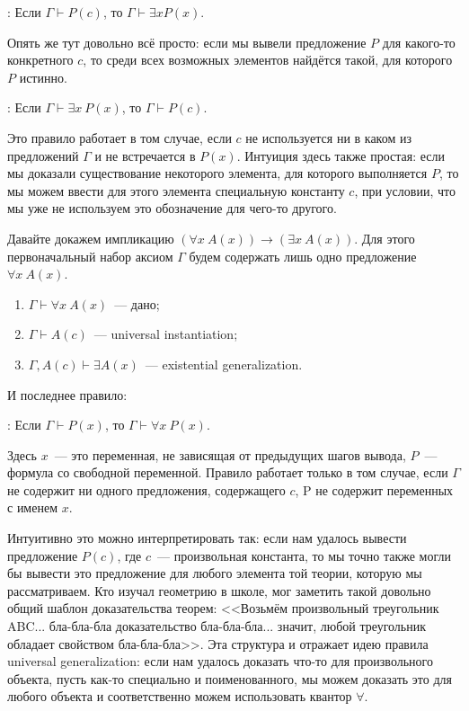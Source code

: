 : Если $\Gamma \vdash P(c)$, то $\Gamma\vdash \exists x P(x)$.

Опять же тут довольно всё просто: если мы вывели предложение $P$ для какого-то конкретного $c$, то среди всех возможных элементов найдётся такой, для которого $P$ истинно.

: Если $\Gamma \vdash \exists x\ P(x)$, то $\Gamma \vdash P(c)$.

Это правило работает в том случае, если $c$ не используется ни в каком из предложений $\Gamma$ и не встречается в $P(x)$. Интуиция здесь также простая: если мы доказали существование некоторого элемента, для которого выполняется $P$, то мы можем ввести для этого элемента специальную константу $c$, при условии, что мы уже не используем это обозначение для чего-то другого.


\begin{example}
Давайте докажем импликацию $(\forall x\ A(x)) \to (\exists x\ A(x))$. Для этого первоначальный набор аксиом $\Gamma$ будем содержать лишь одно предложение $\forall x\ A(x)$.
\begin{enumerate}
\item $\Gamma\vdash \forall x\ A(x)$~--- дано;
\item $\Gamma \vdash A(c)$~--- universal instantiation;
\item $\Gamma, A(c) \vdash \exists A(x)$~--- existential generalization.
\end{enumerate}
\end{example}

И последнее правило:

: Если $\Gamma \vdash P(x)$, то $\Gamma\vdash \forall x\ P(x)$.

Здесь $x$~--- это переменная, не зависящая от предыдущих шагов вывода, $P$~--- формула со свободной переменной. Правило работает только в том случае, если $\Gamma$ не содержит ни одного предложения, содержащего $c$, P не содержит переменных с именем $x$.

Интуитивно это можно интерпретировать так: если нам удалось вывести предложение $P(c)$, где $c$~--- произвольная константа, то мы точно также могли бы вывести это предложение для любого элемента той теории, которую мы рассматриваем. Кто изучал геометрию в школе, мог заметить такой довольно общий шаблон доказательства теорем: <<Возьмём произвольный треугольник ABC... бла-бла-бла доказательство бла-бла-бла... значит, любой треугольник обладает свойством бла-бла-бла>>. Эта структура и отражает идею правила universal generalization: если нам удалось доказать что-то для произвольного объекта, пусть как-то специально и поименованного, мы можем доказать это для любого объекта и соответственно можем использовать квантор $\forall$.

